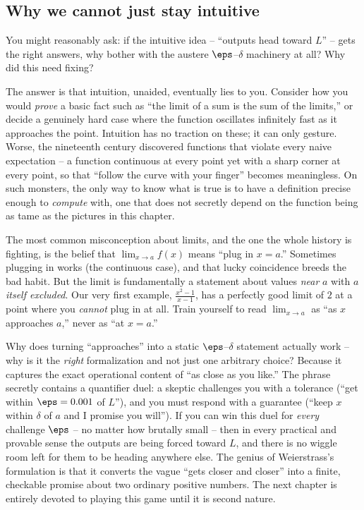\subsection{Why we cannot just stay intuitive}

You might reasonably ask: if the intuitive idea -- ``outputs head toward $L$'' -- gets the right
answers, why bother with the austere $\eps$--$\delta$ machinery at all? Why did this need fixing?

The answer is that intuition, unaided, eventually lies to you. Consider how you would
\emph{prove} a basic fact such as ``the limit of a sum is the sum of the limits,'' or decide a
genuinely hard case where the function oscillates infinitely fast as it approaches the point.
Intuition has no traction on these; it can only gesture. Worse, the nineteenth century discovered
functions that violate every naive expectation -- a function continuous at every point yet with a
sharp corner at every point, so that ``follow the curve with your finger'' becomes meaningless.
On such monsters, the only way to know what is true is to have a definition precise enough to
\emph{compute} with, one that does not secretly depend on the function being as tame as the
pictures in this chapter.

\begin{trapbox}
The most common misconception about limits, and the one the whole history is fighting, is the
belief that $\lim_{x\to a} f(x)$ means ``plug in $x=a$.'' Sometimes plugging in works (the
continuous case), and that lucky coincidence breeds the bad habit. But the limit is fundamentally
a statement about values \emph{near} $a$ with $a$ \emph{itself excluded}. Our very first example,
$\frac{x^2-1}{x-1}$, has a perfectly good limit of $2$ at a point where you \emph{cannot} plug in
at all. Train yourself to read $\lim_{x\to a}$ as ``as $x$ approaches $a$,'' never as ``at
$x=a$.''
\end{trapbox}

\begin{whybox}
Why does turning ``approaches'' into a static $\eps$--$\delta$ statement actually work -- why is
it the \emph{right} formalization and not just one arbitrary choice? Because it captures the
exact operational content of ``as close as you like.'' The phrase secretly contains a quantifier
duel: a skeptic challenges you with a tolerance (``get within $\eps = 0.001$ of $L$''), and you
must respond with a guarantee (``keep $x$ within $\delta$ of $a$ and I promise you will''). If you
can win this duel for \emph{every} challenge $\eps$ -- no matter how brutally small -- then in
every practical and provable sense the outputs are being forced toward $L$, and there is no
wiggle room left for them to be heading anywhere else. The genius of Weierstrass's formulation is
that it converts the vague ``gets closer and closer'' into a finite, checkable promise about two
ordinary positive numbers. The next chapter is entirely devoted to playing this game until it is
second nature.
\end{whybox}

